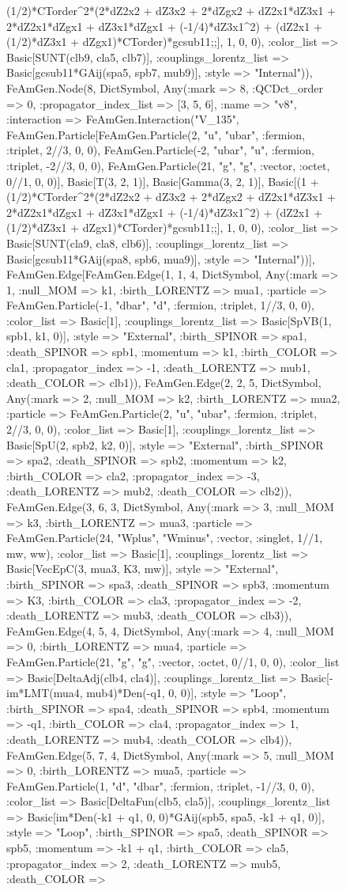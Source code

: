 \documentclass{revtex4}
\begin{document}
\begin{figure}[!htb]
\begin{center}
{(1/2)*CTorder^2*(2*dZ2x2 + dZ3x2 + 2*dZgx2 + dZ2x1*dZ3x1 + 2*dZ2x1*dZgx1 + dZ3x1*dZgx1 + (-1/4)*dZ3x1^2) + (dZ2x1 + (1/2)*dZ3x1 + dZgx1)*CTorder)*gcsub11;;], 1, 0, 0), :color_list => Basic[SUNT(clb9, cla5, clb7)], :couplings_lorentz_list => Basic[gcsub11*GAij(spa5, spb7, mub9)], :style => "Internal")), FeAmGen.Node(8, Dict{Symbol, Any}(:mark => 8, :QCDct_order => 0, :propagator_index_list => [3, 5, 6], :name => "v8", :interaction => FeAmGen.Interaction("V_135", FeAmGen.Particle[FeAmGen.Particle(2, "u", "ubar", :fermion, :triplet, 2//3, 0, 0), FeAmGen.Particle(-2, "ubar", "u", :fermion, :triplet, -2//3, 0, 0), FeAmGen.Particle(21, "g", "g", :vector, :octet, 0//1, 0, 0)], Basic[T(3, 2, 1)], Basic[Gamma(3, 2, 1)], Basic[(1 + (1/2)*CTorder^2*(2*dZ2x2 + dZ3x2 + 2*dZgx2 + dZ2x1*dZ3x1 + 2*dZ2x1*dZgx1 + dZ3x1*dZgx1 + (-1/4)*dZ3x1^2) + (dZ2x1 + (1/2)*dZ3x1 + dZgx1)*CTorder)*gcsub11;;], 1, 0, 0), :color_list => Basic[SUNT(cla9, cla8, clb6)], :couplings_lorentz_list => Basic[gcsub11*GAij(spa8, spb6, mua9)], :style => "Internal"))], FeAmGen.Edge[FeAmGen.Edge(1, 1, 4, Dict{Symbol, Any}(:mark => 1, :null_MOM => k1, :birth_LORENTZ => mua1, :particle => FeAmGen.Particle(-1, "dbar", "d", :fermion, :triplet, 1//3, 0, 0), :color_list => Basic[1], :couplings_lorentz_list => Basic[SpVB(1, spb1, k1, 0)], :style => "External", :birth_SPINOR => spa1, :death_SPINOR => spb1, :momentum => k1, :birth_COLOR => cla1, :propagator_index => -1, :death_LORENTZ => mub1, :death_COLOR => clb1)), FeAmGen.Edge(2, 2, 5, Dict{Symbol, Any}(:mark => 2, :null_MOM => k2, :birth_LORENTZ => mua2, :particle => FeAmGen.Particle(2, "u", "ubar", :fermion, :triplet, 2//3, 0, 0), :color_list => Basic[1], :couplings_lorentz_list => Basic[SpU(2, spb2, k2, 0)], :style => "External", :birth_SPINOR => spa2, :death_SPINOR => spb2, :momentum => k2, :birth_COLOR => cla2, :propagator_index => -3, :death_LORENTZ => mub2, :death_COLOR => clb2)), FeAmGen.Edge(3, 6, 3, Dict{Symbol, Any}(:mark => 3, :null_MOM => k3, :birth_LORENTZ => mua3, :particle => FeAmGen.Particle(24, "Wplus", "Wminus", :vector, :singlet, 1//1, mw, ww), :color_list => Basic[1], :couplings_lorentz_list => Basic[VecEpC(3, mua3, K3, mw)], :style => "External", :birth_SPINOR => spa3, :death_SPINOR => spb3, :momentum => K3, :birth_COLOR => cla3, :propagator_index => -2, :death_LORENTZ => mub3, :death_COLOR => clb3)), FeAmGen.Edge(4, 5, 4, Dict{Symbol, Any}(:mark => 4, :null_MOM => 0, :birth_LORENTZ => mua4, :particle => FeAmGen.Particle(21, "g", "g", :vector, :octet, 0//1, 0, 0), :color_list => Basic[DeltaAdj(clb4, cla4)], :couplings_lorentz_list => Basic[-im*LMT(mua4, mub4)*Den(-q1, 0, 0)], :style => "Loop", :birth_SPINOR => spa4, :death_SPINOR => spb4, :momentum => -q1, :birth_COLOR => cla4, :propagator_index => 1, :death_LORENTZ => mub4, :death_COLOR => clb4)), FeAmGen.Edge(5, 7, 4, Dict{Symbol, Any}(:mark => 5, :null_MOM => 0, :birth_LORENTZ => mua5, :particle => FeAmGen.Particle(1, "d", "dbar", :fermion, :triplet, -1//3, 0, 0), :color_list => Basic[DeltaFun(clb5, cla5)], :couplings_lorentz_list => Basic[im*Den(-k1 + q1, 0, 0)*GAij(spb5, spa5, -k1 + q1, 0)], :style => "Loop", :birth_SPINOR => spa5, :death_SPINOR => spb5, :momentum => -k1 + q1, :birth_COLOR => cla5, :propagator_index => 2, :death_LORENTZ => mub5, :death_COLOR => }
\end{center}
\end{figure}
\end{document}
